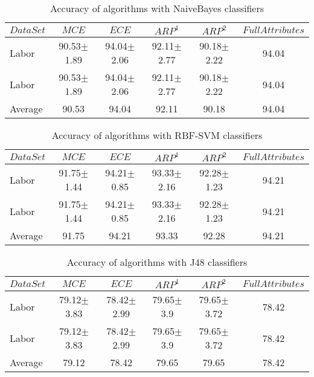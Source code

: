 \documentclass[final,5p,times]{elsarticle}
\begin{document}
\begin{table*}[htbp]
\centering
\caption{Accuracy of  algorithms with NaiveBayes classifiers}
\label{tab:reduction:accresults:naivebayes}
	\begin{tabular}{lccccc}
	\toprule
	$DataSet$ &
	$MCE$ &
	$ECE$ &
	$ARP^1$ &
	$ARP^2$ &
	$FullAttributes$ \\
	\midrule
	Labor	&	90.53$\pm$1.89	&	94.04$\pm$2.06	&	92.11$\pm$2.77	&	90.18$\pm$2.22	&	94.04	\\
	Labor	&	90.53$\pm$1.89	&	94.04$\pm$2.06	&	92.11$\pm$2.77	&	90.18$\pm$2.22	&	94.04	\\
	\midrule
	Average	&	90.53	&	94.04	&	92.11	&	90.18	&	94.04	\\
	\bottomrule
	\end{tabular}
\end{table*}



\begin{table*}[htbp]
\centering
\caption{Accuracy of  algorithms with RBF-SVM classifiers}
\label{tab:reduction:accresults:rbf-svm}
	\begin{tabular}{lccccc}
	\toprule
	$DataSet$ &
	$MCE$ &
	$ECE$ &
	$ARP^1$ &
	$ARP^2$ &
	$FullAttributes$ \\
	\midrule
	Labor	&	91.75$\pm$1.44	&	94.21$\pm$0.85	&	93.33$\pm$2.16	&	92.28$\pm$1.23	&	94.21	\\
	Labor	&	91.75$\pm$1.44	&	94.21$\pm$0.85	&	93.33$\pm$2.16	&	92.28$\pm$1.23	&	94.21	\\
	\midrule
	Average	&	91.75	&	94.21	&	93.33	&	92.28	&	94.21	\\
	\bottomrule
	\end{tabular}
\end{table*}



\begin{table*}[htbp]
\centering
\caption{Accuracy of  algorithms with J48 classifiers}
\label{tab:reduction:accresults:j48}
	\begin{tabular}{lccccc}
	\toprule
	$DataSet$ &
	$MCE$ &
	$ECE$ &
	$ARP^1$ &
	$ARP^2$ &
	$FullAttributes$ \\
	\midrule
	Labor	&	79.12$\pm$3.83	&	78.42$\pm$2.99	&	79.65$\pm$3.9	&	79.65$\pm$3.72	&	78.42	\\
	Labor	&	79.12$\pm$3.83	&	78.42$\pm$2.99	&	79.65$\pm$3.9	&	79.65$\pm$3.72	&	78.42	\\
	\midrule
	Average	&	79.12	&	78.42	&	79.65	&	79.65	&	78.42	\\
	\bottomrule
	\end{tabular}
\end{table*}
\end{document}
